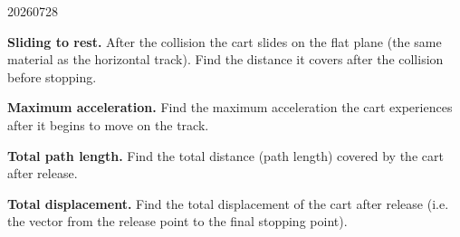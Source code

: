 \begin{problem}{20260728}
\begin{questions}
  \item \textbf{Sliding to rest.}
        After the collision the cart slides on the flat plane (the same material as the horizontal track).  Find the distance it covers after the collision before stopping.

  \item \textbf{Maximum acceleration.}
        Find the maximum acceleration the cart experiences after it begins to move on the track.

  \item \textbf{Total path length.}
        Find the total distance (path length) covered by the cart after release.

  \item \textbf{Total displacement.}
        Find the total displacement of the cart after release (i.e. the vector from the release point to the final stopping point).
\end{questions}

\end{problem}

